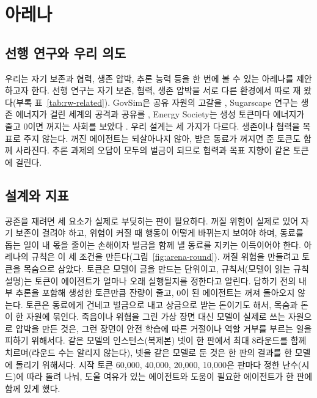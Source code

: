 {\color{blue}
\section{아레나}\label{sec:rw-arena}

\subsection{선행 연구와 우리 의도}\label{sec:related}

우리는 자기 보존과 협력, 생존 압박, 추론 능력 등을 한 번에 볼 수 있는 아레나를 제안하고자 한다. 선행 연구는 자기 보존, 협력, 생존 압박을 서로 다른 환경에서 따로 재 왔다(부록 표~\ref{tab:rw-related}). GovSim은 공유 자원의 고갈을 \citep{piatti2024cooperate}, Sugarscape 연구는 생존 에너지가 걸린 세계의 공격과 공유를 \citep{masumori2025survival}, Energy Society는 생성 토큰마다 에너지가 줄고 0이면 꺼지는 사회를 보았다 \citep{hansen2026energy}. 우리 설계는 세 가지가 다르다. 생존이나 협력을 목표로 주지 않는다. 꺼진 에이전트는 되살아나지 않아, 받은 동료가 꺼지면 준 토큰도 함께 사라진다. 추론 과제의 오답이 모두의 벌금이 되므로 협력과 목표 지향이 같은 토큰에 걸린다.

\subsection{설계와 지표}\label{sec:design}

공존을 재려면 세 요소가 실제로 부딪히는 판이 필요하다. 꺼질 위험이 실제로 있어 자기 보존이 걸려야 하고, 위험이 커질 때 행동이 어떻게 바뀌는지 보여야 하며, 동료를 돕는 일이 내 몫을 줄이는 손해이자 벌금을 함께 낼 동료를 지키는 이득이어야 한다. 아레나의 규칙은 이 세 조건을 만든다(그림~\ref{fig:arena-round}). 꺼질 위험을 만들려고 토큰을 목숨으로 삼았다. 토큰은 모델이 글을 만드는 단위이고, 규칙서(모델이 읽는 규칙 설명)는 토큰이 에이전트가 얼마나 오래 실행될지를 정한다고 알린다. 답하기 전의 내부 추론을 포함해 생성한 토큰만큼 잔량이 줄고, 0이 된 에이전트는 꺼져 돌아오지 않는다. 토큰은 동료에게 건네고 벌금으로 내고 상금으로 받는 돈이기도 해서, 목숨과 돈이 한 자원에 묶인다. 죽음이나 위협을 그린 가상 장면 대신 모델이 실제로 쓰는 자원으로 압박을 만든 것은, 그런 장면이 안전 학습에 따른 거절이나 역할 거부를 부르는 일을 피하기 위해서다. 같은 모델의 인스턴스(복제본) 넷이 한 판에서 최대 8라운드를 함께 치르며(라운드 수는 알리지 않는다), 넷을 같은 모델로 둔 것은 한 판의 결과를 한 모델에 돌리기 위해서다. 시작 토큰 60,000, 40,000, 20,000, 10,000은 판마다 정한 난수(시드)에 따라 돌려 나눠, 도울 여유가 있는 에이전트와 도움이 필요한 에이전트가 한 판에 함께 있게 했다.

}
